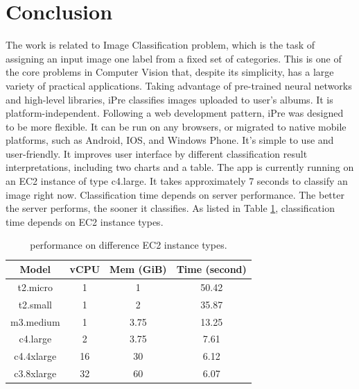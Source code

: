 \documentclass[conference]{IEEEtran}
\begin{document}




\section{Conclusion}
The work is related to Image Classification problem, which is the task of assigning an input image one label from a fixed set of categories. This is one of the core problems in Computer Vision that, despite its simplicity, has a large variety of practical applications. Taking advantage of pre-trained neural networks and high-level libraries, iPre classifies images uploaded to user's albums.
It is platform-independent. Following a web development pattern, iPre was designed to be more flexible. It can be run on any browsers, or migrated to native mobile platforms, such as Android, IOS, and Windows Phone.
It's simple to use and user-friendly. It improves user interface by different classification result interpretations, including two charts and a table.
The app is currently running on an EC2 instance of type c4.large. It takes approximately 7 seconds to classify an image right now. Classification time depends on server performance. The better the server performs, the sooner it classifies. As listed in Table \ref{tab:table1}, classification time depends on EC2 instance types.

\begin{table}[h!]
  \centering
  \caption{performance on difference EC2 instance types.}
  \label{tab:table1}
  \begin{tabular}{cccc}
    \toprule
    Model & vCPU & Mem (GiB) & Time (second)\\
    \midrule
    t2.micro & 1 & 1 & 50.42\\
    t2.small & 1 & 2 & 35.87\\
    m3.medium & 1 & 3.75 & 13.25\\
    c4.large & 2 & 3.75 & 7.61\\
    c4.4xlarge & 16 & 30 & 6.12\\
    c3.8xlarge & 32 & 60 & 6.07\\
    \bottomrule
  \end{tabular}
\end{table}
\end{document}
